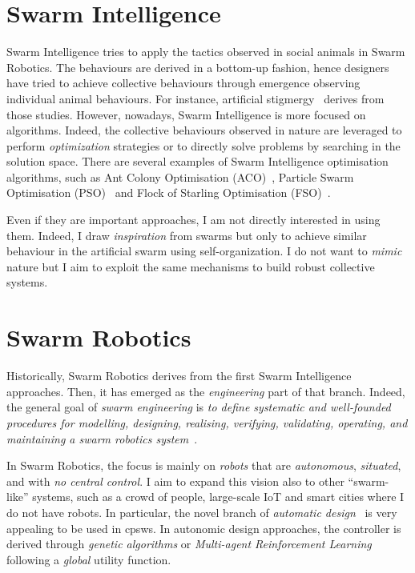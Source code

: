 \section{Swarm Intelligence}

Swarm Intelligence tries to apply the tactics observed in social animals in Swarm Robotics. 
%
The behaviours are derived in a bottom-up fashion, hence designers have tried to achieve collective behaviours through emergence observing individual animal behaviours.
%
For instance, artificial stigmergy~\cite{DBLP:journals/fgcs/DorigoBT00} derives from those studies.
%
However, nowadays, Swarm Intelligence is more focused on algorithms.
% 
Indeed, the collective behaviours observed in nature are leveraged to perform \textit{optimization} strategies or to directly solve problems by searching in the solution space.
There are several examples of Swarm Intelligence optimisation algorithms, such as Ant Colony Optimisation (ACO)~\cite{DBLP:journals/tsmc/DorigoMC96}, Particle Swarm Optimisation (PSO)~\cite{DBLP:conf/icnn/KennedyE95} and Flock of Starling Optimisation (FSO)~\cite{DBLP:series/sci/FulgineiS11}.

Even if they are important approaches, I am not directly interested in using them. 
%
Indeed, I draw \textit{inspiration} from swarms but only to achieve similar behaviour in the artificial swarm using self-organization. 
%
I do not want to \textit{mimic} nature but I aim to exploit the same mechanisms to build robust collective systems.

\section{Swarm Robotics}

Historically, Swarm Robotics derives from the first Swarm Intelligence approaches. 
%
Then, it has emerged as the \textit{engineering} part of that branch. 
%
Indeed, the general goal of \emph{swarm engineering} is \emph{to define systematic and well-founded procedures for modelling, designing, realising, verifying, validating, operating, and maintaining a swarm robotics system}~\cite{DBLP:journals/swarm/BrambillaFBD13}.

In Swarm Robotics, the focus is mainly on \textit{robots} that are \emph{autonomous}, \emph{situated}, and with \emph{no central control}. 
%
I aim to expand this vision also to other ``swarm-like'' systems, such as a crowd of people, large-scale IoT and smart cities where I do not have robots. 
%
In particular, the novel branch of \textit{automatic design}~\cite{DBLP:journals/firai/FrancescaB16} is very appealing to be used in \acp{cpsw}. 
%
In autonomic design approaches, the controller is derived through \textit{genetic algorithms} or \textit{Multi-agent Reinforcement Learning} following a \textit{global} utility function. 
